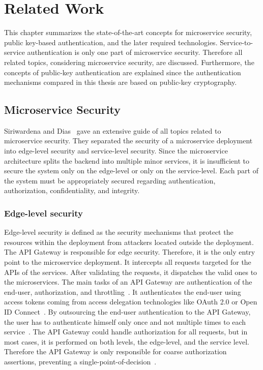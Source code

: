 \chapter{Related Work}
\label{cha:Related_Work}
This chapter summarizes the state-of-the-art concepts for microservice security, public key-based authentication, and the later required technologies.
Service-to-service authentication is only one part of microservice security.
Therefore all related topics, considering microservice security, are discussed.
Furthermore, the concepts of public-key authentication are explained since the authentication mechanisms compared in this thesis are based on public-key cryptography.

\section{Microservice Security}
Siriwardena and Dias~\cite{dias2020microservices} gave an extensive guide of all topics related to microservice security. 
They separated the security of a microservice deployment into edge-level security and service-level security.
Since the microservice architecture splits the backend into multiple minor services, it is insufficient to secure the system only on the edge-level or only on the service-level.
Each part of the system must be appropriately secured regarding authentication, authorization, confidentiality, and integrity.

\subsection{Edge-level security}
Edge-level security is defined as the security mechanisms that protect the resources within the deployment from attackers located outside the deployment. 
The API Gateway is responsible for edge security. 
Therefore, it is the only entry point to the microservice deployment.
It intercepts all requests targeted for the APIs of the services.
After validating the requests, it dispatches the valid ones to the microservices.
The main tasks of an API Gateway are authentication of the end-user, authorization, and throttling~\cite{dias2020microservices}.
It authenticates the end-user using access tokens coming from access delegation technologies like OAuth 2.0 or Open ID Connect~\cite{siriwardena2014advanced}.
By outsourcing the end-user authentication to the API Gateway, the user has to authenticate himself only once and not multiple times to each service~\cite{dias2020microservices}.
The API Gateway could handle authorization for all requests, but in most cases, it is performed on both levels, the edge-level, and the service level. 
Therefore the API Gateway is only responsible for coarse authorization assertions, preventing a single-point-of-decision~\cite{barabanov2020authentication}.

